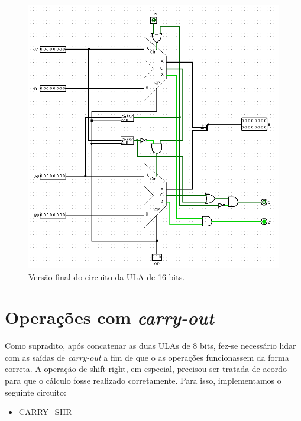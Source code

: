 \documentclass[
	12pt,				%
	openright,			%
	twoside,			%
	a4paper,			%
	english,			%
	french,				%
	spanish,			%
	brazil,				%
	]{abntex2}
\begin{document}
\begin{figure}[H]
	\begin{center}
	    \includegraphics[scale=0.48]{ULA16.png}
	\end{center}
\caption{\label{ula16}Versão final do circuito da ULA de 16 bits.}
\end{figure}
    
\section{Operações com \textit{carry-out}}\label{opcarry}
Como supradito, após concatenar as duas ULAs de 8 bits, fez-se necessário lidar com as saídas de \textit{carry-out} a fim de que o as operações funcionassem da forma correta. A operação de shift right, em especial, precisou ser tratada de acordo para que o cálculo fosse realizado corretamente. 
Para isso, implementamos o seguinte circuito:

\begin{itemize}
  \item  CARRY\_SHR
\end{itemize}
\end{document}

